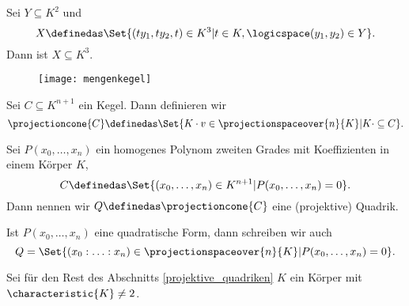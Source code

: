 \begin{beispiel}
  Sei \( Y\subseteq K^2 \) und
  \begin{equation*}
    X\definedas\Set{(ty_1,ty_2,t)\in K^3| t\in K,\logicspace (y_1,y_2)\in Y}.
  \end{equation*}
  Dann ist \( X\subseteq K^3 \).
  \begin{figure}[H]
    \centering
    \texttt{[image: mengenkegel]}
    \label{fig:mengenkegel}
  \end{figure} 
\end{beispiel}
Sei \( C\subseteq K^{n+1} \) ein Kegel. Dann definieren wir
\begin{equation*}
  \projectioncone{C}\definedas \Set{K\cdot v\in \projectionspaceover{n}{K}|K\cdot \subseteq C}.
\end{equation*}
\begin{definition*}
  Sei \( P(x_0,\dotsc,x_n) \) ein homogenes Polynom zweiten Grades mit Koeffizienten in einem Körper \( K \),
  \begin{equation*}
    C\definedas \Set{(x_0,\dotsc,x_n)\in K^{n+1}|P(x_0,\dotsc,x_n)=0}.
  \end{equation*}
  Dann nennen wir \( Q\definedas \projectioncone{C} \) eine (projektive) Quadrik.
\end{definition*}
\begin{bemerkung*}
  Ist \( P(x_0,\dotsc,x_n) \) eine quadratische Form, dann schreiben wir auch
  \begin{equation*}
    Q=\Set{(x_0:\dotsc:x_n)\in \projectionspaceover{n}{K}|P(x_0,\dotsc,x_n)=0}.
  \end{equation*}
\end{bemerkung*}
\begin{konvention*}
  Sei für den Rest des Abschnitts \ref{projektive_quadriken} \( K \) ein Körper mit \( \characteristic{K}\neq 2 \).
\end{konvention*}
